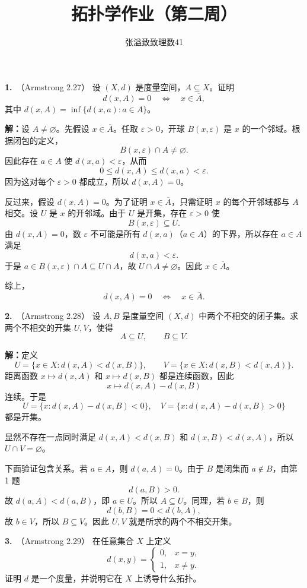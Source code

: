 \documentclass{article}
\title{拓扑学作业（第二周）}
\author{张溢致\quad 致理数41\quad 2024011936}
\date{}
\newcommand{\problem}[2]{\par\medskip\noindent\textbf{#1.}\ （#2）\quad}
\newcommand{\solution}{\par\noindent\textbf{解：}}
\begin{document}
\maketitle


\problem{1}{Armstrong 2.27}
设 $(X,d)$ 是度量空间，$A\subseteq X$。证明
\[
  d(x,A)=0 \quad\Longleftrightarrow\quad x\in\overline A,
\]
其中 $d(x,A)=\inf\{d(x,a):a\in A\}$。


\solution 设 $A\ne\varnothing$。先假设 $x\in\overline A$。任取 $\varepsilon>0$，开球 $B(x,\varepsilon)$ 是 $x$ 的一个邻域。根据闭包的定义，
\[
  B(x,\varepsilon)\cap A\ne\varnothing.
\]
因此存在 $a\in A$ 使 $d(x,a)<\varepsilon$，从而
\[
  0\le d(x,A)\le d(x,a)<\varepsilon.
\]
因为这对每个 $\varepsilon>0$ 都成立，所以 $d(x,A)=0$。

反过来，假设 $d(x,A)=0$。为了证明 $x\in\overline A$，只需证明 $x$ 的每个开邻域都与 $A$ 相交。设 $U$ 是 $x$ 的开邻域。由于 $U$ 是开集，存在 $\varepsilon>0$ 使
\[
  B(x,\varepsilon)\subseteq U.
\]
由 $d(x,A)=0$，数 $\varepsilon$ 不可能是所有 $d(x,a)$（$a\in A$）的下界，所以存在 $a\in A$ 满足
\[
  d(x,a)<\varepsilon.
\]
于是 $a\in B(x,\varepsilon)\cap A\subseteq U\cap A$，故 $U\cap A\ne\varnothing$。因此 $x\in\overline A$。

综上，
\[
  d(x,A)=0\quad\Longleftrightarrow\quad x\in\overline A.
\]

\problem{2}{Armstrong 2.28}
设 $A,B$ 是度量空间 $(X,d)$ 中两个不相交的闭子集。求两个不相交的开集 $U,V$，使得
\[
  A\subseteq U,\qquad B\subseteq V.
\]


\solution 定义
\[
  U=\{x\in X:d(x,A)<d(x,B)\},
  \qquad
  V=\{x\in X:d(x,B)<d(x,A)\}.
\]
距离函数 $x\mapsto d(x,A)$ 和 $x\mapsto d(x,B)$ 都是连续函数，因此
\[
  x\longmapsto d(x,A)-d(x,B)
\]
连续。于是
\[
  U=\{x:d(x,A)-d(x,B)<0\},
  \quad
  V=\{x:d(x,A)-d(x,B)>0\}
\]
都是开集。

显然不存在一点同时满足 $d(x,A)<d(x,B)$ 和 $d(x,B)<d(x,A)$，所以 $U\cap V=\varnothing$。

下面验证包含关系。若 $a\in A$，则 $d(a,A)=0$。由于 $B$ 是闭集而 $a\notin B$，由第 1 题
\[
  d(a,B)>0.
\]
故 $d(a,A)<d(a,B)$，即 $a\in U$。所以 $A\subseteq U$。同理，若 $b\in B$，则
\[
  d(b,B)=0<d(b,A),
\]
故 $b\in V$，所以 $B\subseteq V$。因此 $U,V$ 就是所求的两个不相交开集。

\problem{3}{Armstrong 2.29}
在任意集合 $X$ 上定义
\[
  d(x,y)=
  \begin{cases}
    0,&x=y,\\
    1,&x\ne y.
  \end{cases}
\]
证明 $d$ 是一个度量，并说明它在 $X$ 上诱导什么拓扑。
\end{document}
